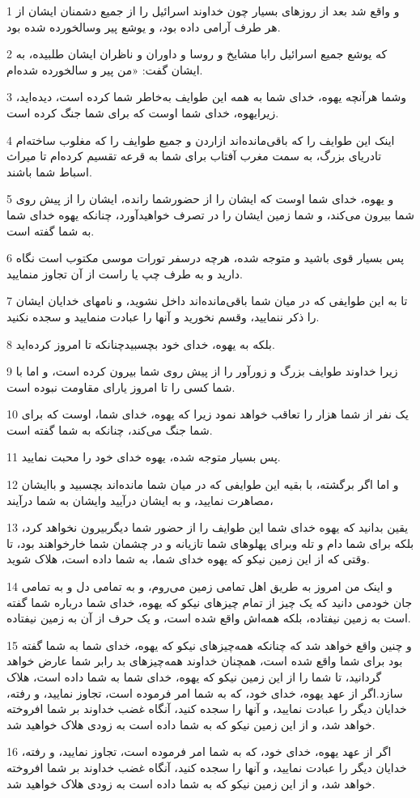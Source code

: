 \par 1 و واقع شد بعد از روزهای بسیار چون خداوند اسرائیل را از جمیع دشمنان ایشان از هر طرف آرامی داده بود، و یوشع پیر وسالخورده شده بود.
\par 2 که یوشع جمیع اسرائیل رابا مشایخ و روسا و داوران و ناظران ایشان طلبیده، به ایشان گفت: «من پیر و سالخورده شده‌ام.
\par 3 وشما هرآنچه یهوه، خدای شما به همه این طوایف به‌خاطر شما کرده است، دیده‌اید، زیرایهوه، خدای شما اوست که برای شما جنگ کرده است.
\par 4 اینک این طوایف را که باقی‌مانده‌اند ازاردن و جمیع طوایف را که مغلوب ساخته‌ام تادریای بزرگ، به سمت مغرب آفتاب برای شما به قرعه تقسیم کرده‌ام تا میراث اسباط شما باشند.
\par 5 و یهوه، خدای شما اوست که ایشان را از حضورشما رانده، ایشان را از پیش روی شما بیرون می‌کند، و شما زمین ایشان را در تصرف خواهیدآورد، چنانکه یهوه خدای شما به شما گفته است.
\par 6 پس بسیار قوی باشید و متوجه شده، هر‌چه درسفر تورات موسی مکتوب است نگاه دارید و به طرف چپ یا راست از آن تجاوز منمایید.
\par 7 تا به این طوایفی که در میان شما باقی‌مانده‌اند داخل نشوید، و نامهای خدایان ایشان را ذکر ننمایید، وقسم نخورید و آنها را عبادت منمایید و سجده نکنید.
\par 8 بلکه به یهوه، خدای خود بچسبیدچنانکه تا امروز کرده‌اید.
\par 9 زیرا خداوند طوایف بزرگ و زورآور را از پیش روی شما بیرون کرده است، و اما با شما کسی را تا امروز یارای مقاومت نبوده است.
\par 10 یک نفر از شما هزار را تعاقب خواهد نمود زیرا که یهوه، خدای شما، اوست که برای شما جنگ می‌کند، چنانکه به شما گفته است.
\par 11 پس بسیار متوجه شده، یهوه خدای خود را محبت نمایید.
\par 12 و اما اگر برگشته، با بقیه این طوایفی که در میان شما مانده‌اند بچسبید و باایشان مصاهرت نمایید، و به ایشان درآیید وایشان به شما درآیند،
\par 13 یقین بدانید که یهوه خدای شما این طوایف را از حضور شما دیگربیرون نخواهد کرد، بلکه برای شما دام و تله وبرای پهلوهای شما تازیانه و در چشمان شما خارخواهند بود، تا وقتی که از این زمین نیکو که یهوه خدای شما، به شما داده است، هلاک شوید.
\par 14 و اینک من امروز به طریق اهل تمامی زمین می‌روم، و به تمامی دل و به تمامی جان خودمی دانید که یک چیز از تمام چیزهای نیکو که یهوه، خدای شما درباره شما گفته است به زمین نیفتاده، بلکه همه‌اش واقع شده است، و یک حرف از آن به زمین نیفتاده.
\par 15 و چنین واقع خواهد شد که چنانکه همه‌چیزهای نیکو که یهوه، خدای شما به شما گفته بود برای شما واقع شده است، همچنان خداوند همه‌چیزهای بد رابر شما عارض خواهد گردانید، تا شما را از این زمین نیکو که یهوه، خدای شما به شما داده است، هلاک سازد.اگر از عهد یهوه، خدای خود، که به شما امر فرموده است، تجاوز نمایید، و رفته، خدایان دیگر را عبادت نمایید، و آنها را سجده کنید، آنگاه غضب خداوند بر شما افروخته خواهد شد، و از این زمین نیکو که به شما داده است به زودی هلاک خواهید شد.
\par 16 اگر از عهد یهوه، خدای خود، که به شما امر فرموده است، تجاوز نمایید، و رفته، خدایان دیگر را عبادت نمایید، و آنها را سجده کنید، آنگاه غضب خداوند بر شما افروخته خواهد شد، و از این زمین نیکو که به شما داده است به زودی هلاک خواهید شد.
 
